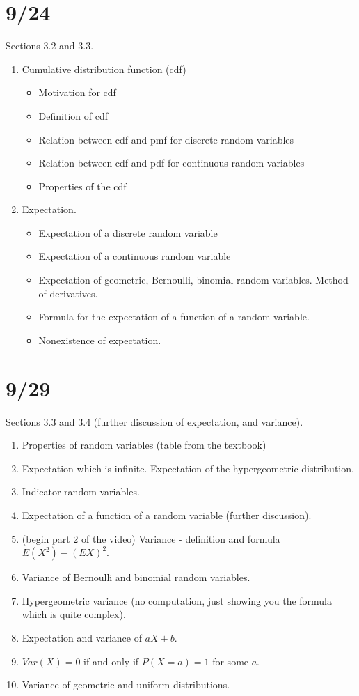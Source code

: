 \documentclass[letterpaper,11pt,oneside,reqno]{amsart}
\numberwithin{equation}{section}
\theoremstyle{definition}
\begin{document}
\section{9/24}

Sections 3.2 and 3.3.

\begin{enumerate}
	\item Cumulative distribution function (cdf)
	\begin{itemize}
		\item Motivation for cdf
		\item Definition of cdf
		\item Relation between cdf and pmf for discrete random variables
		\item Relation between cdf and pdf for continuous random variables
		\item Properties of the cdf
	\end{itemize}
\item Expectation.
	\begin{itemize}
		\item Expectation of a discrete random variable
		\item Expectation of a continuous random variable
		\item Expectation of geometric, Bernoulli, binomial random variables.
			Method of derivatives.
		\item Formula for the expectation of a function of a random
			variable.
		\item Nonexistence of expectation.
	\end{itemize}
\end{enumerate}

\section{9/29}

Sections 3.3 and 3.4 (further discussion of expectation, and 
variance).
\begin{enumerate}
	\item Properties of random variables (table from the textbook)
	\item Expectation which is infinite. 
		Expectation of the hypergeometric distribution.
	\item Indicator random variables.
	\item Expectation of a function of a random variable (further discussion).
	\item (begin part 2 of the video)
		Variance - definition and formula $E(X^2)-(EX)^2$.
	\item Variance of Bernoulli and binomial random variables.
	\item Hypergeometric variance (no computation, just showing you the formula which is quite complex).
	\item Expectation and variance of $aX+b$.
	\item $Var(X)=0$ if and only if $P(X=a)=1$ for some $a$.
	\item Variance of geometric and uniform distributions.
\end{enumerate}
\end{document}
